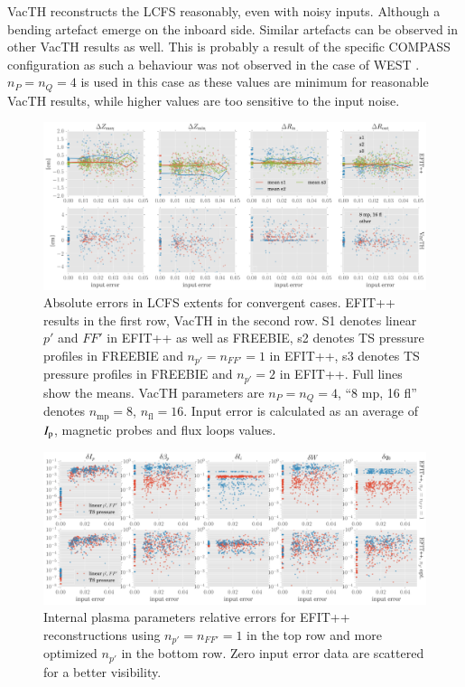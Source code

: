VacTH reconstructs the LCFS reasonably, even with noisy inputs. Although a bending artefact emerge on the inboard side. Similar artefacts can be observed in other VacTH results as well. This is probably a result of the specific COMPASS configuration as such a behaviour was not observed in the case of WEST \cite{vacthref}. $n_P = n_Q = 4$ is used in this case as these values are minimum for reasonable VacTH results, while higher values are too sensitive to the input noise.

\begin{figure}[!htb]
\centering   %
\hfill{}
\includegraphics[width=17.5cm]{RZstats.pdf}
\hfill{}
\caption{Absolute errors in LCFS extents for convergent cases. EFIT++ results in the first row, VacTH in the second row. S1 denotes linear $p'$ and $FF'$ in EFIT++ as well as FREEBIE, s2 denotes TS pressure profiles in FREEBIE and $n_{p'} = n_{FF'} = 1$ in EFIT++, s3 denotes TS pressure profiles in FREEBIE and $n_{p'} = 2$ in EFIT++. Full lines show the means. VacTH parameters are $n_P=n_Q=4$, ``8 mp, 16 fl'' denotes $n_\mathrm{mp}=8$, $n_\mathrm{fl}=16$. Input error is calculated as an average of $I_{\rm{p}}$, magnetic probes and flux loops values. 
}
\label{fig:RZstats}
\end{figure}

\begin{figure}[!htb]
\centering   %
\hfill{}
\includegraphics[width=17.5cm]{kinetic_stats_opt.pdf}
\hfill{}
\caption{Internal plasma parameters relative errors for EFIT++ reconstructions using $n_{p'}=n_{FF'}=1$ in the top row and more optimized $n_{p'}$ in the bottom row. Zero input error data are scattered for a better visibility.}
\label{fig:kinetic_stats}
\end{figure}


